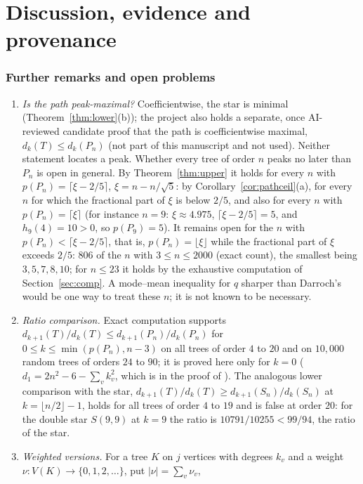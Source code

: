 \documentclass[11pt]{amsart}
\theoremstyle{definition}
\theoremstyle{remark}
\begin{document}
\part*{Discussion, evidence and provenance}

\section{Further remarks and open problems}\label{sec:open}

\begin{enumerate}
\item \emph{Is the path peak-maximal?} Coefficientwise, the star is minimal
(Theorem~\ref{thm:lower}(b)); the project also holds a separate, once
AI-reviewed candidate proof that the path is coefficientwise maximal,
$d_k(T)\le d_k(P_n)$ (not part of this manuscript and not used). Neither
statement locates a peak. Whether every tree of order $n$ peaks no later than
$P_n$ is open in general. By Theorem~\ref{thm:upper} it holds for every $n$
with $p(P_n)=\lceil\xi-2/5\rceil$, $\xi=n-n/\sqrt5$: by
Corollary~\ref{cor:pathceil}(a), for every $n$ for which the fractional part
of $\xi$ is below $2/5$, and also for every $n$ with $p(P_n)=\lceil\xi\rceil$
(for instance $n=9$: $\xi\approx4.975$, $\lceil\xi-2/5\rceil=5$, and
$h_9(4)=10>0$, so $p(P_9)=5$). It remains open for the $n$ with
$p(P_n)<\lceil\xi-2/5\rceil$, that is, $p(P_n)=\lfloor\xi\rfloor$ while the
fractional part of $\xi$ exceeds $2/5$: $806$ of the $n$ with
$3\le n\le2000$ (exact count), the smallest being $3,5,7,8,10$; for $n\le23$
it holds by the exhaustive computation of Section~\ref{sec:comp}. A
mode--mean inequality for $q$ sharper than Darroch's would be one way to
treat these $n$; it is not known to be necessary.
\item \emph{Ratio comparison.} Exact computation supports
$d_{k+1}(T)/d_k(T)\le d_{k+1}(P_n)/d_k(P_n)$ for
$0\le k\le\min(p(P_n),n-3)$ on all trees of order $4$ to $20$ and on $10{,}000$
random trees of orders $24$ to $90$; it is proved here only for $k=0$
($d_1=2n^2-6-\sum_vk_v^2$, which is in the proof of \cite[Theorem~3.3]{AAB}).
The analogous lower comparison with the star,
$d_{k+1}(T)/d_k(T)\ge d_{k+1}(S_n)/d_k(S_n)$ at $k=\lfloor n/2\rfloor-1$, holds
for all trees of order $4$ to $19$ and is false at order $20$: for the double
star $S(9,9)$ at $k=9$ the ratio is $10791/10255<99/94$, the ratio of the star.
\item \emph{Weighted versions.} For a tree $K$ on $j$ vertices with degrees
$k_v$ and a weight $\nu\colon V(K)\to\{0,1,2,\dots\}$, put $|\nu|=\sum_v\nu_v$,

\end{enumerate}
\end{document}
